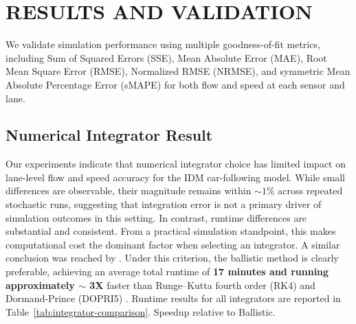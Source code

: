 \documentclass{scspaperproc}
\theoremstyle{scsthe}
\begin{document}

\section{RESULTS AND VALIDATION}
\label{sec:results}
We validate simulation performance using multiple goodness-of-fit metrics, including Sum of Squared Errors (SSE), Mean Absolute Error (MAE), Root Mean Square Error (RMSE), Normalized RMSE (NRMSE), and symmetric Mean Absolute Percentage Error (sMAPE) for both flow and speed at each sensor and lane.

\enlargethispage{2\baselineskip}
\subsection{Numerical Integrator Result}
Our experiments indicate that numerical integrator choice has limited impact on lane-level flow and speed accuracy for the IDM car-following model. While small differences are observable, their magnitude remains within $\sim 1\%$ across repeated stochastic runs, suggesting that integration error is not a primary driver of simulation outcomes in this setting. In contrast, runtime differences are substantial and consistent. From a practical simulation standpoint, this makes computational cost the dominant factor when selecting an integrator. A similar conclusion was reached by \cite{treiber2015comparing, pvrikryl2017comparing}. Under this criterion, the ballistic method is clearly preferable, achieving an average total runtime of \textbf{17 minutes and running approximately $\sim$ 3X} faster than Runge–Kutta fourth order (RK4) and Dormand-Prince (DOPRI5) \cite{dormand1980family}. Runtime results for all integrators are reported in Table~\ref{tab:integrator-comparison}. Speedup relative to Ballistic.
\end{document}
